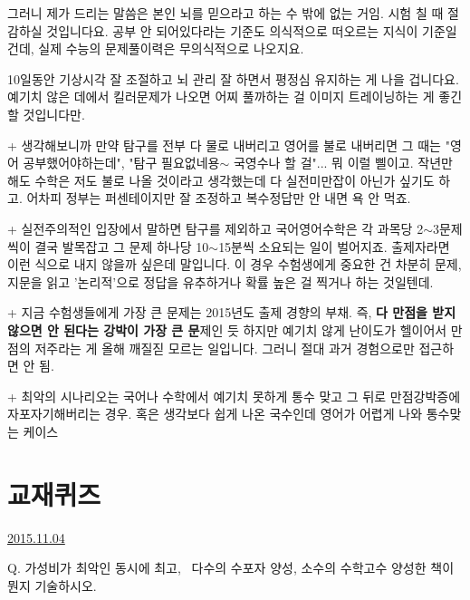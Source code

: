 그러니 제가 드리는 말씀은 본인 뇌를 믿으라고 하는 수 밖에 없는 거임. 시험 칠 때 절감하실 것입니다요.
공부 안 되어있다라는 기준도 의식적으로 떠오르는 지식이 기준일 건데,
실제 수능의 문제풀이력은 무의식적으로 나오지요.
\vspace{5mm}

10일동안 기상시각 잘 조절하고 뇌 관리 잘 하면서 평정심 유지하는 게 나을 겁니다요.
예기치 않은 데에서 킬러문제가 나오면 어찌 풀까하는 걸 이미지 트레이닝하는 게 좋긴 할 것입니다만.
\vspace{5mm}

+ 생각해보니까 만약 탐구를 전부 다 물로 내버리고 영어를 불로 내버리면
그 때는 "영어 공부했어야하는데", "탐구 필요없네용$\sim$ 국영수나 할 걸"... 뭐 이럴 삘이고.
작년만 해도 수학은 저도 불로 나올 것이라고 생각했는데 다 실전미만잡이 아닌가 싶기도 하고.
어차피 정부는 퍼센테이지만 잘 조정하고 복수정답만 안 내면 욕 안 먹죠.
\vspace{5mm}

+ 실전주의적인 입장에서 말하면 탐구를 제외하고 국어영어수학은 각 과목당 2$\sim$3문제씩이 결국 발목잡고
그 문제 하나당 10$\sim$15분씩 소요되는 일이 벌어지죠. 출제자라면 이런 식으로 내지 않을까 싶은데 말입니다.
이 경우 수험생에게 중요한 건 차분히 문제, 지문을 읽고 '논리적'으로 정답을 유추하거나 확률 높은 걸 찍거나 하는 것일텐데.
\vspace{5mm}

+ 지금 수험생들에게 가장 큰 문제는 2015년도 출제 경향의 부채. 즉, \textbf{다 만점을 받지 않으면 안 된다는 강박이 가장 큰 문}제인 듯
하지만 예기치 않게 난이도가 헬이어서 만점의 저주라는 게 올해 깨질짇 모르는 일입니다. 그러니 절대 과거 경험으로만 접근하면 안 됨.
\vspace{5mm}

+ 최악의 시나리오는 국어나 수학에서 예기치 못하게 통수 맞고 그 뒤로 만점강박증에 자포자기해버리는 경우.
혹은 생각보다 쉽게 나온 국수인데 영어가 어렵게 나와 통수맞는 케이스
\vspace{5mm}






\section{교재퀴즈}
\href{https://www.kockoc.com/Apoc/462586}{2015.11.04}

\vspace{5mm}

Q. 가성비가 최악인 동시에 최고,  다수의 수포자 양성, 소수의 수학고수 양성한 책이 뭔지 기술하시오.
\vspace{5mm}

